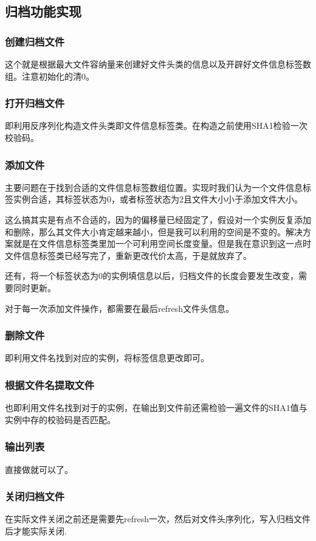 \documentclass[11pt, a4paper]{article}
\begin{document}
\begin{CJK*}{UTF8}{gbsn}
		\subsection{归档功能实现}
			\subsubsection*{创建归档文件}
				这个就是根据最大文件容纳量来创建好文件头类的信息以及开辟好文件信息标签数组。注意初始化的清0。
			\subsubsection*{打开归档文件}
				即利用反序列化构造文件头类即文件信息标签类。在构造之前使用SHA1检验一次校验码。
			\subsubsection*{添加文件}
				主要问题在于找到合适的文件信息标签数组位置。实现时我们认为一个文件信息标签实例合适，其标签状态为0，或者标签状态为2且文件大小小于添加文件大小。
				
				这么搞其实是有点不合适的，因为的偏移量已经固定了，假设对一个实例反复添加和删除，那么其文件大小肯定越来越小，但是我可以利用的空间是不变的。解决方案就是在文件信息标签类里加一个可利用空间长度变量。但是我在意识到这一点时文件信息标签类已经写完了，重新更改代价太高，于是就放弃了。
				
				还有，将一个标签状态为0的实例填信息以后，归档文件的长度会要发生改变，需要同时更新。
				
				对于每一次添加文件操作，都需要在最后refresh文件头信息。

			\subsubsection*{删除文件}
				即利用文件名找到对应的实例，将标签信息更改即可。
				
			\subsubsection*{根据文件名提取文件}
				也即利用文件名找到对于的实例，在输出到文件前还需检验一遍文件的SHA1值与实例中存的校验码是否匹配。
				
			\subsubsection*{输出列表}
				直接做就可以了。
			
			\subsubsection*{关闭归档文件}
				在实际文件关闭之前还是需要先refresh一次，然后对文件头序列化，写入归档文件后才能实际关闭.
				


\end{CJK*}
\end{document}

